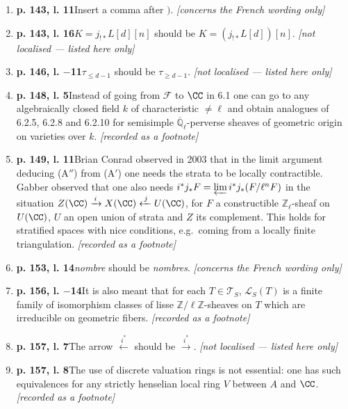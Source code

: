 \documentclass[12pt,oneside]{amsbook}
\theoremstyle{plain}
\theoremstyle{definition}
\newcommand{\FF}{\mathcal{F}}
\newcommand{\LL}{\mathcal{L}}
\newcommand{\TT}{\mathcal{T}}
\newcommand{\ZZ}{\mathbb{Z}}  \newcommand{\QQ}{\mathbb{Q}}
\newcommand{\Zl}{\mathbb{Z}_{\ell}}
\newcommand{\Qlb}{\overline{\mathbb{Q}}_{\ell}}
\begin{document}
\begin{enumerate}[label={\arabic*.},leftmargin=2.6em,itemsep=4pt]
\item \textbf{p. 143, l. 11}\quad Insert a comma after $)$. \hfill\newline \textsl{[concerns the French wording only]}
\item \textbf{p. 143, l. 16}\quad $K=j_{!*}L[d][n]$ should be $K=(j_{!*}L[d])[n]$. \hfill\newline \textsl{[not localised --- listed here only]}
\item \textbf{p. 146, l. $-$11}\quad $\tau_{\leq d-1}$ should be $\tau_{\geq d-1}$. \hfill\newline \textsl{[not localised --- listed here only]}
\item \textbf{p. 148, l. 5}\quad Instead of going from $\FF$ to $\CC$ in 6.1 one can go to any algebraically closed field $k$ of characteristic $\neq\ell$ and obtain analogues of 6.2.5, 6.2.8 and 6.2.10 for semisimple $\Qlb$-perverse sheaves of geometric origin on varieties over $k$. \hfill\newline \textsl{[recorded as a footnote]}
\item \textbf{p. 149, l. 11}\quad Brian Conrad observed in 2003 that in the limit argument deducing (A$''$) from (A$'$) one needs the strata to be locally contractible. Gabber observed that one also needs $i^{*}j_{*}F=\varprojlim i^{*}j_{*}(F/\ell^{n}F)$ in the situation $Z(\CC)\xrightarrow{\,i\,}X(\CC)\xleftarrow{\,j\,}U(\CC)$, for $F$ a constructible $\Zl$-sheaf on $U(\CC)$, $U$ an open union of strata and $Z$ its complement. This holds for stratified spaces with nice conditions, e.g.\ coming from a locally finite triangulation. \hfill\newline \textsl{[recorded as a footnote]}
\item \textbf{p. 153, l. 14}\quad \emph{nombre} should be \emph{nombres}. \hfill\newline \textsl{[concerns the French wording only]}
\item \textbf{p. 156, l. $-$14}\quad It is also meant that for each $T\in\TT_{S}$, $\LL_{S}(T)$ is a finite family of isomorphism classes of lisse $\ZZ/\ell\ZZ$-sheaves on $T$ which are irreducible on geometric fibers. \hfill\newline \textsl{[recorded as a footnote]}
\item \textbf{p. 157, l. 7}\quad The arrow $\xleftarrow{\,i^{*}\,}$ should be $\xrightarrow{\,i^{*}\,}$. \hfill\newline \textsl{[not localised --- listed here only]}
\item \textbf{p. 157, l. 8}\quad The use of discrete valuation rings is not essential: one has such equivalences for any strictly henselian local ring $V$ between $A$ and $\CC$. \hfill\newline \textsl{[recorded as a footnote]}

\end{enumerate}
\end{document}
